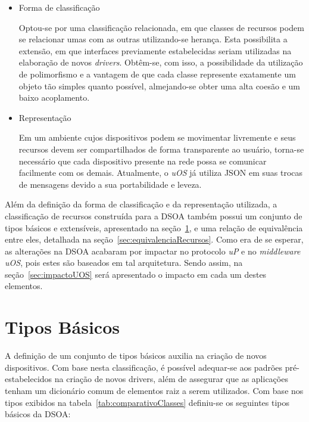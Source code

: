 \begin{itemize}
	\item Forma de classificação

	Optou-se por uma classificação relacionada, em que classes de recursos podem se relacionar umas com as outras utilizando-se herança. Esta possibilita a extensão, em que interfaces previamente estabelecidas seriam utilizadas na elaboração de novos \emph{drivers}. Obtêm-se, com isso, a possibilidade da utilização de polimorfismo e a vantagem de que cada classe represente exatamente um objeto tão simples quanto possível, almejando-se obter uma alta coesão e um baixo acoplamento.

	\item Representação

	Em um ambiente cujos dispositivos podem se movimentar livremente e seus recursos devem ser compartilhados de forma transparente ao usuário, torna-se necessário que cada dispositivo presente na rede possa se comunicar facilmente com os demais. Atualmente, o \emph{uOS} já utiliza JSON em suas trocas de mensagens devido a sua portabilidade e leveza.
\end{itemize}

Além da definição da forma de classificação e da representação utilizada, a classificação de recursos construída para a DSOA também possui um conjunto de tipos básicos e extensíveis, apresentado na seção~\ref{sec:tiposBasicos}, e uma relação de equivalência entre eles, detalhada na seção~\ref{sec:equivalenciaRecursos}. Como era de se esperar, as alterações na DSOA acabaram por impactar no protocolo \emph{uP} e no \emph{middleware uOS}, pois estes são baseados em tal arquitetura. Sendo assim, na seção~\ref{sec:impactoUOS} será apresentado o impacto em cada um destes elementos.

\section{Tipos Básicos}
\label{sec:tiposBasicos}

A definição de um conjunto de tipos básicos auxilia na criação de novos dispositivos. Com base nesta classificação, é possível adequar-se aos padrões pré-estabelecidos na criação de novos drivers, além de assegurar que as aplicações tenham um dicionário comum de elementos raiz a serem utilizados. Com base nos tipos exibidos na tabela~\ref{tab:comparativoClasses} definiu-se os seguintes tipos básicos da DSOA:

